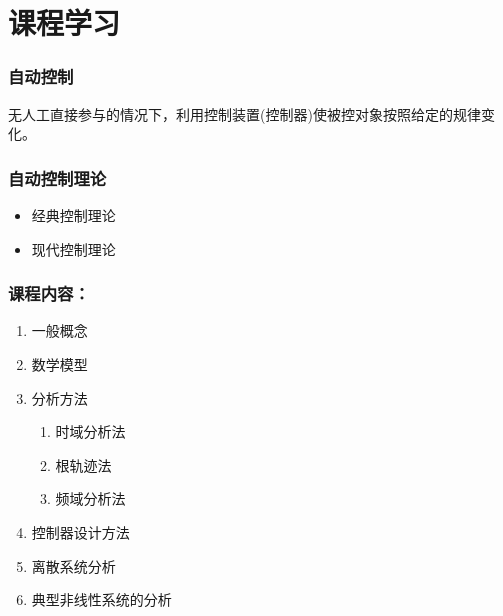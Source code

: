 \documentclass{beamer}
\begin{document}
\section{课程学习}
\label{sec-3}
\begin{frame}
\frametitle{自动控制}
\label{sec-3-1}

 无人工直接参与的情况下，利用控制装置(控制器)使被控对象按照给定的规律变化。
\end{frame}
\begin{frame}
\frametitle{自动控制理论}
\label{sec-3-2}

\begin{itemize}
\item <2->经典控制理论
\item <3->现代控制理论
\end{itemize}
\end{frame}
\begin{frame}
\frametitle{课程内容：}
\label{sec-3-3}

\begin{enumerate}
\item <2->一般概念
\item <3->数学模型
\item <4->分析方法
\begin{enumerate}
\item 时域分析法
\item 根轨迹法
\item 频域分析法
\end{enumerate}
\item <5->控制器设计方法
\item <6->离散系统分析
\item <7->典型非线性系统的分析
\end{enumerate}
\end{frame}
\end{document}
